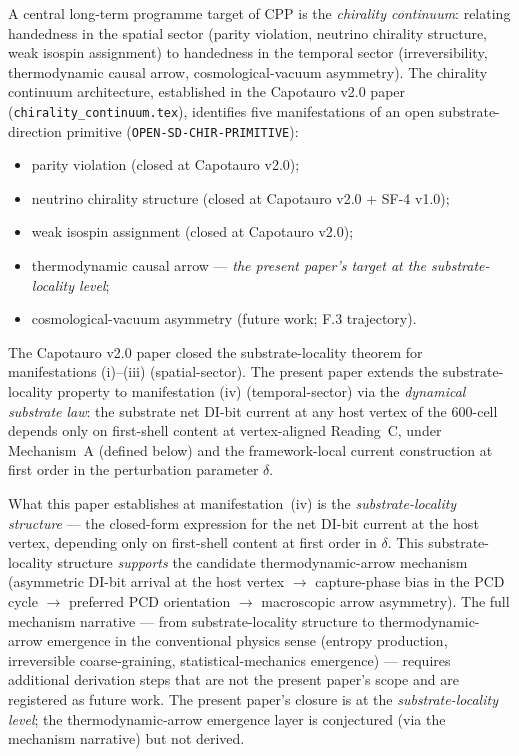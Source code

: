 \documentclass[11pt,letterpaper]{article}
\begin{document}
A central long-term programme target of CPP is the \emph{chirality continuum}: relating handedness in the spatial sector (parity violation, neutrino chirality structure, weak isospin assignment) to handedness in the temporal sector (irreversibility, thermodynamic causal arrow, cosmological-vacuum asymmetry). The chirality continuum architecture, established in the Capotauro v2.0 paper (\texttt{chirality\_continuum.tex}), identifies five manifestations of an open substrate-direction primitive (\texttt{OPEN-SD-CHIR-PRIMITIVE}):
\begin{itemize}[leftmargin=2em]
\item[(i)] parity violation (closed at Capotauro v2.0);
\item[(ii)] neutrino chirality structure (closed at Capotauro v2.0 + SF-4 v1.0);
\item[(iii)] weak isospin assignment (closed at Capotauro v2.0);
\item[(iv)] thermodynamic causal arrow --- \emph{the present paper's target at the substrate-locality level};
\item[(v)] cosmological-vacuum asymmetry (future work; F.3 trajectory).
\end{itemize}

The Capotauro v2.0 paper closed the substrate-locality theorem for manifestations (i)--(iii) (spatial-sector). The present paper extends the substrate-locality property to manifestation (iv) (temporal-sector) via the \emph{dynamical substrate law}: the substrate net DI-bit current at any host vertex of the 600-cell depends only on first-shell content at vertex-aligned Reading~C, under Mechanism~A (defined below) and the framework-local current construction at first order in the perturbation parameter $\delta$.

What this paper establishes at manifestation~(iv) is the \emph{substrate-locality structure} --- the closed-form expression for the net DI-bit current at the host vertex, depending only on first-shell content at first order in $\delta$. This substrate-locality structure \emph{supports} the candidate thermodynamic-arrow mechanism (asymmetric DI-bit arrival at the host vertex $\to$ capture-phase bias in the PCD cycle $\to$ preferred PCD orientation $\to$ macroscopic arrow asymmetry). The full mechanism narrative --- from substrate-locality structure to thermodynamic-arrow emergence in the conventional physics sense (entropy production, irreversible coarse-graining, statistical-mechanics emergence) --- requires additional derivation steps that are not the present paper's scope and are registered as future work. The present paper's closure is at the \emph{substrate-locality level}; the thermodynamic-arrow emergence layer is conjectured (via the mechanism narrative) but not derived.
\end{document}
